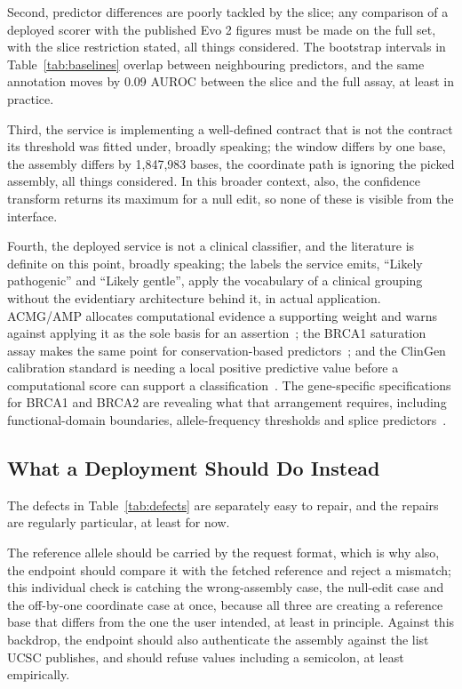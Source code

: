 \documentclass[10pt,journal]{IEEEtran}
\begin{document}
Second, predictor differences are poorly tackled by the slice; any comparison of a deployed scorer with the published Evo 2 figures must be made on the full set, with the slice restriction stated, all things considered. The bootstrap intervals in Table~\ref{tab:baselines} overlap between neighbouring predictors, and the same annotation moves by 0.09 AUROC between the slice and the full assay, at least in practice.

Third, the service is implementing a well-defined contract that is not the contract its threshold was fitted under, broadly speaking; the window differs by one base, the assembly differs by 1{,}847{,}983 bases, the coordinate path is ignoring the picked assembly, all things considered. In this broader context, also, the confidence transform returns its maximum for a null edit, so none of these is visible from the interface.

Fourth, the deployed service is not a clinical classifier, and the literature is definite on this point, broadly speaking; the labels the service emits, ``Likely pathogenic'' and ``Likely gentle'', apply the vocabulary of a clinical grouping without the evidentiary architecture behind it, in actual application. ACMG/AMP allocates computational evidence a supporting weight and warns against applying it as the sole basis for an assertion~\cite{richards2015acmg}; the BRCA1 saturation assay makes the same point for conservation-based predictors~\cite{findlay2018brca1}; and the ClinGen calibration standard is needing a local positive predictive value before a computational score can support a classification~\cite{pejaver2022svi}. The gene-specific specifications for BRCA1 and BRCA2 are revealing what that arrangement requires, including functional-domain boundaries, allele-frequency thresholds and splice predictors~\cite{clinGenBrcaVcep2025}.

\subsection{What a Deployment Should Do Instead}
The defects in Table~\ref{tab:defects} are separately easy to repair, and the repairs are regularly particular, at least for now.

The reference allele should be carried by the request format, which is why also, the endpoint should compare it with the fetched reference and reject a mismatch; this individual check is catching the wrong-assembly case, the null-edit case and the off-by-one coordinate case at once, because all three are creating a reference base that differs from the one the user intended, at least in principle. Against this backdrop, the endpoint should also authenticate the assembly against the list UCSC publishes, and should refuse values including a semicolon, at least empirically.
\end{document}
